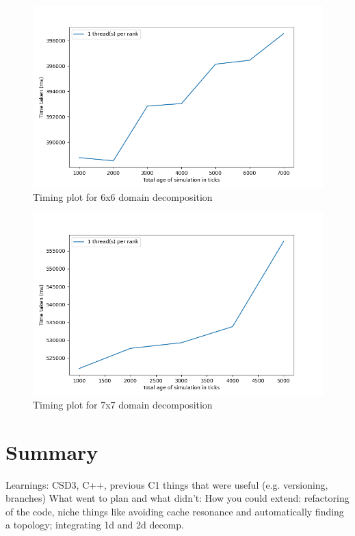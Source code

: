 \documentclass[12pt]{article}
\begin{document}
\begin{figure}[hp]
    \includegraphics[scale=0.65, center]{figures/time_hybrid_r36_plot.png}
    \caption{Timing plot for 6x6 domain decomposition}
    \label{fig:time_r36}
\end{figure}

\begin{figure}[hp]
    \includegraphics[scale=0.65, center]{figures/time_hybrid_r49_plot.png}
    \caption{Timing plot for 7x7 domain decomposition}
    \label{fig:time_r49}
\end{figure}


\section*{Summary}

Learnings: CSD3, C++, previous C1 things that were useful (e.g. versioning, branches)
What went to plan and what didn't:
How you could extend: refactoring of the code, niche things like avoiding cache resonance and automatically finding a topology; integrating 1d and 2d decomp.
\end{document}
